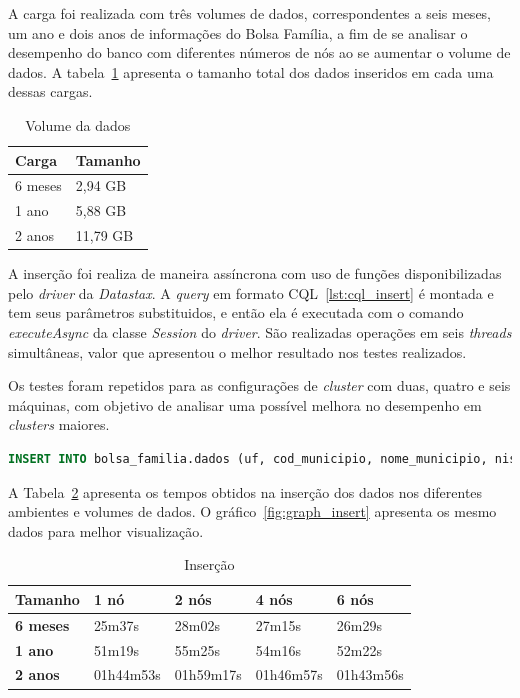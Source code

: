 A carga foi realizada com três volumes de dados, correspondentes a seis meses, um ano e dois anos de informações do Bolsa Família, a fim de se analisar o desempenho do banco com diferentes números de nós ao se aumentar o volume de dados. A tabela~\ref{tab:volume} apresenta o tamanho total dos dados inseridos em cada uma dessas cargas.

\begin{table}[]
	\centering
	\caption{Volume da dados}
	\label{tab:volume}
	\begin{tabular}{ll}
		\textbf{Carga} & \textbf{Tamanho} \\ \hline
		6 meses        &  2,94 GB             \\ \hline
		1 ano          &  5,88 GB             \\ \hline
		2 anos         &  11,79 GB             \\ \hline
	\end{tabular}
\end{table}

A inserção foi realiza de maneira assíncrona com uso de funções disponibilizadas pelo \emph{driver} da \emph{Datastax}. A \emph{query} em formato CQL~\ref{lst:cql_insert} é montada e tem seus parâmetros substituidos, e então ela é executada com o comando \emph{executeAsync} da classe \emph{Session} do \emph{driver}. São realizadas operações em seis \emph{threads} simultâneas, valor que apresentou o melhor resultado nos testes realizados.

Os testes foram repetidos para as configurações de \emph{cluster} com duas, quatro e seis máquinas, com objetivo de analisar uma possível melhora no desempenho em \emph{clusters} maiores.

\begin{lstlisting}[caption={Código CQL para inserção},label={lst:cql_insert},language=SQL]
INSERT INTO bolsa_familia.dados (uf, cod_municipio, nome_municipio, nis_favorecido, nome_favorecido, fonte, valor, periodo) VALUES (?, ?, ?, ?, ?, ?, ?, ?)
\end{lstlisting}

A Tabela~\ref{tb_insert} apresenta os tempos obtidos na inserção dos dados nos diferentes ambientes e volumes de dados. O gráfico~\ref{fig:graph_insert} apresenta os mesmo dados para melhor visualização.


\begin{table}[]
	\centering
	\caption{Inserção}
	\label{tb_insert}
	\begin{tabular}{lllll}
		\textbf{Tamanho}	& \textbf{1 nó} & \textbf{2 nós} & \textbf{4 nós} & \textbf{6 nós} \\ \hline
		\textbf{6 meses}    & 25m37s        & 28m02s         & 27m15s         & 26m29s         \\ \hline
		\textbf{1 ano}      & 51m19s        & 55m25s         & 54m16s         & 52m22s         \\ \hline
		\textbf{2 anos}     & 01h44m53s     & 01h59m17s      & 01h46m57s      & 01h43m56s      \\ \hline
	\end{tabular}
\end{table}

